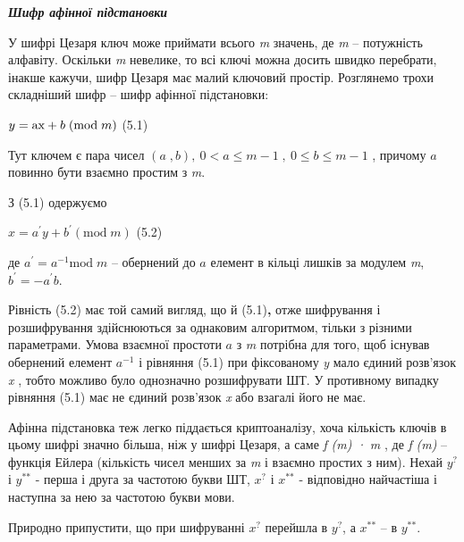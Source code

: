 \documentclass[a4paper]{article}
\newcounter{}
\newcommand\normalsubformula[1]{\text{\mathversion{normal}$#1$}}
\begin{document}
\bigskip


\bigskip


\bigskip

{\centering\bfseries\itshape
Шифр афінної підстановки
\par}


\bigskip


\bigskip

У шифрі Цезаря ключ може приймати всього \textit{m}\textbf{\textit{ }}значень,
де \textit{m }–\textit{ }потужність алфавіту. Оскільки  \textit{m} невелике, то
всі ключі можна досить швидко перебрати, інакше кажучи, шифр Цезаря має малий
ключовий простір. Розглянемо трохи складніший шифр – шифр афінної підстановки:

{\raggedleft
  ${y=\normalsubformula{\text{ax}}+b\;(\text{mod}\;m)}$  (5.1)
\par}

Тут ключем є пара чисел  ${(a\;,b),\ 0<a\le m-1\;,\ 0\le b\le m-1}$ , причому 
${a}$ повинно бути взаємно простим з \textit{m}.

З (5.1)\textbf{ }одержуємо

{\raggedleft
  ${x={a}^{'}y+{b}^{'}(\text{mod}\;m)}$  (5.2)
\par}

де  ${{a}^{'}=a^{{-1}}\text{mod}\;m}$ – обернений до  ${a}$ елемент в кільці
лишків за модулем \textit{m},   ${{b}^{'}=-{a}^{'}b}$.

Рівність (5.2)\textbf{ }має той самий вигляд, що й (5.1)\textbf{, }отже
шифрування і розшифрування здійснюються за однаковим алгоритмом, тільки з
різними параметрами. Умова взаємної простоти  ${a}$ з \textit{m} потрібна для
того, щоб існував обернений елемент  ${a^{{-1}}}$ і рівняння (5.1) при
фіксованому \textit{y} мало єдиний розв’язок  \textit{x} , тобто можливо було
однозначно розшифрувати ШТ. У противному випадку рівняння (5.1) має не єдиний
розв’язок  \textit{x} або взагалі його не має.

Афінна підстановка теж легко піддається криптоаналізу, хоча кількість ключів в
цьому шифрі значно більша, ніж у шифрі Цезаря, а саме 
\textit{\textgreek{f}}\textit{ (m) · }\textit{m} , де
\textit{\textgreek{f}}\textit{ (m)} – функція Ейлера (кількість чисел менших за
\textit{m} і взаємно простих з ним). Нехай   ${y^{{?}}}$ і  ${y^{{\text{**}}}}$
- перша і друга за частотою букви ШТ,  ${x^{{?}}}$ і  ${x^{{\text{**}}}}$ -
відповідно найчастіша і наступна за нею за частотою букви мови.

Природно припустити, що при шифруванні  ${x^{{?}}}$ перейшла в  ${y^{{?}}}$, а 
${x^{{\text{**}}}}$ – в  ${y^{{\text{**}}}}$.
\end{document}
